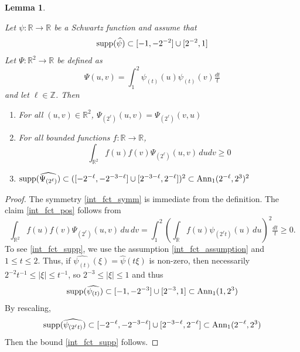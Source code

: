 \documentclass[12pt,reqno]{amsart}
\theoremstyle{plain}
\newtheorem{lemma}[theorem]{Lemma}
\numberwithin{equation}{section}
\theoremstyle{remark}
\newcommand{\uses}[1]{}
\newcommand{\usesdefs}[1]{}
\newcommand{\leanok}{}
\newcommand{\lean}[1]{}
\newcommand{\Z}{{\mathbb Z}}
\newcommand{\R}{{\mathbb R}}
\begin{document}
   \begin{lemma}
         \label{lem:int_fct}\uses{}\usesdefs{}
\lean{Auto.integralFct}
\leanok
          Let $\psi:\R\to \R$ be a Schwartz function and assume that
          \begin{equation}
              \label{int_fct_assumption}
              \textup{supp}(\widehat{\psi})
\subset  [-1,-2^{-2}]\cup [2^{-2},1]
          \end{equation}
     Let $\Psi:\R^2\to \R$ be defined as
     \begin{equation}\label{auto:integrated-tensor-kernel}\Psi(u,v) = \int_1^2 \psi_{(t)}(u) \psi_{(t)}(v) \tfrac{dt}{t}\end{equation}
     and let $\ell\in\Z$.
   Then
        \begin{enumerate}
    \item  \label{int_fct_symm} For all $(u,v)\in \R^2$,  $\Psi_{(2^\ell)}(u,v) = \Psi_{(2^\ell)}(v,u)$
     \item \label{int_fct_pos}  For all bounded functions $f:\R\to\R$,
     \begin{equation}\label{auto:integrated-tensor-positivity}
         \int_{\R^2} f(u){f(v)} \Psi_{(2^\ell)}(u,v)\,dudv
         \ge 0
     \end{equation}
     \item  \label{int_fct_supp}
     $         \textup{supp}(\widehat{\Psi_{(2^\ell)}})
\subset  ([-2^{-\ell},-2^{-3-\ell}]\cup [2^{-3-\ell},2^{-\ell}])^2 \subset \textup{Ann}_1(2^{-\ell},2^3)^2$
     \end{enumerate}
     \end{lemma}
          \begin{proof}
The symmetry \eqref{int_fct_symm}
 is immediate from the definition.
 The claim \eqref{int_fct_pos} follows from
          \[
\int_{\R^2}f(u)f(v)\Psi_{(2^\ell)}(u,v)\,du\,dv
=
\int_1^2\left(\int_\R f(u)\psi_{(2^\ell t)}(u)\,du\right)^2\tfrac{dt}{t}
\ge0.
\]
To see \eqref{int_fct_supp}, we use the assumption \eqref{int_fct_assumption} and $1\le t \le 2$. Thus, if  $\widehat{\psi_{(t)}}(\xi) = \widehat{\psi}(t\xi)$ is non-zero, then necessarily $2^{-2}t^{-1}\le |\xi|\le t^{-1} $, so $2^{-3}\le |\xi| \le 1 $ and thus
\[         \textup{supp}(\widehat{\psi_{(t)}})
\subset  [-1,-2^{-3}]\cup [2^{-3},1] \subset \textup{Ann}_1(1,2^3) \]
By rescaling,
\[         \textup{supp}(\widehat{\psi_{(2^\ell t)}})
\subset  [-2^{-\ell},-2^{-3-\ell}]\cup [2^{-3-\ell},2^{-\ell}] \subset \textup{Ann}_1(2^{-\ell},2^3) \]
Then the bound \eqref{int_fct_supp}
  follows.
     \end{proof}
\end{document}
